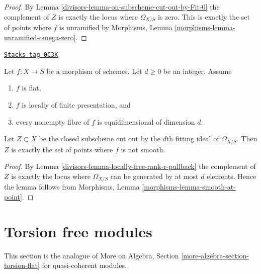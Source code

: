 \begin{proof}

By Lemma \ref{divisors-lemma-on-subscheme-cut-out-by-Fit-0} the complement of $Z$
is exactly the locus where $\Omega_{X/S}$ is zero. This is exactly
the set of points where $f$ is unramified by
Morphisms, Lemma \ref{morphisms-lemma-unramified-omega-zero}.
\end{proof}

\begin{lemma}
\label{divisors-lemma-d-fitting-ideal-omega-smooth}
\href{https://stacks.math.columbia.edu/tag/0C3K}{\texttt{Stacks tag 0C3K}}

Let $f : X \to S$ be a morphism of schemes. Let $d \geq 0$ be an integer.
Assume
\begin{enumerate}
\item $f$ is flat,
\item $f$ is locally of finite presentation, and
\item every nonempty fibre of $f$ is equidimensional of dimension $d$.
\end{enumerate}
Let $Z \subset X$ be the closed subscheme cut out by the $d$th fitting
ideal of $\Omega_{X/S}$. Then $Z$ is exactly the set of points
where $f$ is not smooth.
\end{lemma}

\begin{proof}

By Lemma \ref{divisors-lemma-locally-free-rank-r-pullback} the complement of $Z$
is exactly the locus where $\Omega_{X/S}$ can be generated by at most
$d$ elements. Hence the lemma follows from
Morphisms, Lemma \ref{morphisms-lemma-smooth-at-point}.
\end{proof}

\section{Torsion free modules}
\label{divisors-section-torsion-free}
This section is the analogue of
More on Algebra, Section \ref{more-algebra-section-torsion-flat}
for quasi-coherent modules.

